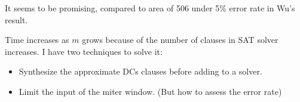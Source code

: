 \documentclass{article}
\begin{document}
It seems to be promising,
compared to area of 506 under 5\% error rate in Wu's result.

Time increases as $m$ grows because of the number of clauses in SAT solver increases.
I have two techniques to solve it:
\begin{itemize}
    \item Synthesize the approximate DCs clauses before adding to a solver.
    \item Limit the input of the miter window. (But how to assess the error rate)
\end{itemize}
\end{document}
